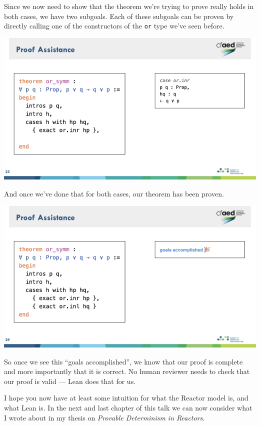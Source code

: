 \documentclass{article}
\begin{document}
Since we now need to show that the theorem we're trying to prove really holds in both cases, we have two subgoals.
Each of these subgoals can be proven by directly calling one of the constructors of the \verb|or| type we've seen before.

\begin{center}
    \includegraphics[width=\columnwidth]{Slides/Slide 23.jpeg}
\end{center}

And once we've done that for both cases, our theorem has been proven.

\begin{center}
    \includegraphics[width=\columnwidth]{Slides/Slide 24.jpeg}
\end{center}

So once we see this ``goals accomplished'', we know that our proof is complete and more importantly that it is correct.
No human reviewer needs to check that our proof is valid --- Lean does that for us.


I hope you now have at least some intuition for what the Reactor model is, and what Lean is.
In the next and last chapter of this talk we can now consider what I wrote about in my thesis on \emph{Provable Determinism in Reactors}.
\end{document}
